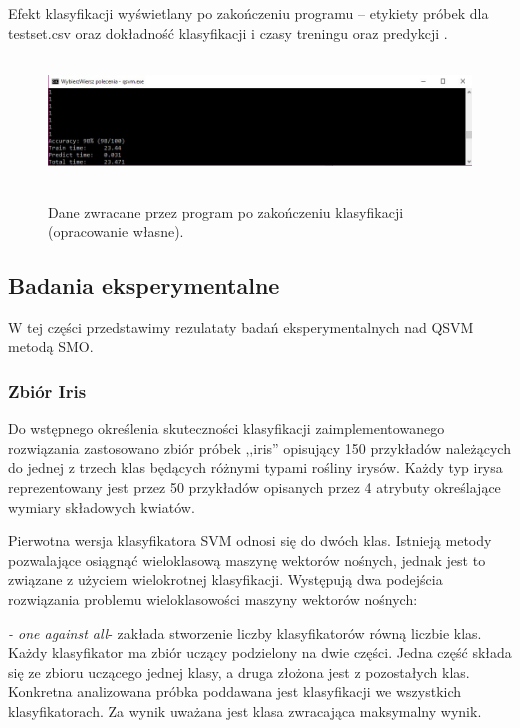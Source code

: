 \documentclass[[10pt,a4paper]{article}
\begin{document}
\begin{enumerate}
\begin{itemize}
\noindent Efekt klasyfikacji wyświetlany po zakończeniu programu -- etykiety próbek dla testset.csv oraz dokładność klasyfikacji i czasy treningu oraz predykcji .
\begin{figure}[h]
\centering
\includegraphics[width=4.50in, height=1.32in]{results.jpg}\\
\caption{Dane zwracane przez program po zakończeniu klasyfikacji (opracowanie własne).}
\end{figure}

\subsection{Badania eksperymentalne} 

\noindent W tej części przedstawimy rezulataty badań eksperymentalnych nad QSVM metodą SMO.


\subsubsection{Zbiór Iris}


\noindent Do wstępnego określenia skuteczności klasyfikacji zaimplementowanego rozwiązania zastosowano zbiór próbek ,,iris'' opisujący 150 przykładów należących do jednej z trzech klas będących różnymi typami rośliny irysów. Każdy typ irysa reprezentowany jest przez 50 przykładów opisanych przez 4 atrybuty określające wymiary składowych kwiatów. 

\noindent Pierwotna wersja klasyfikatora SVM odnosi się do dwóch klas. Istnieją metody pozwalające osiągnąć wieloklasową maszynę wektorów nośnych, jednak jest to związane z użyciem wielokrotnej klasyfikacji. Występują dwa podejścia rozwiązania problemu wieloklasowości maszyny wektorów nośnych:

\noindent \textit{- one against all}- zakłada stworzenie liczby klasyfikatorów równą liczbie klas. Każdy klasyfikator ma zbiór uczący podzielony na dwie części. Jedna część składa się ze zbioru uczącego jednej klasy, a druga złożona jest z pozostałych klas. Konkretna analizowana próbka poddawana jest klasyfikacji we wszystkich klasyfikatorach. Za wynik uważana jest klasa zwracająca maksymalny wynik.


\end{itemize}
\end{enumerate}
\end{document}
